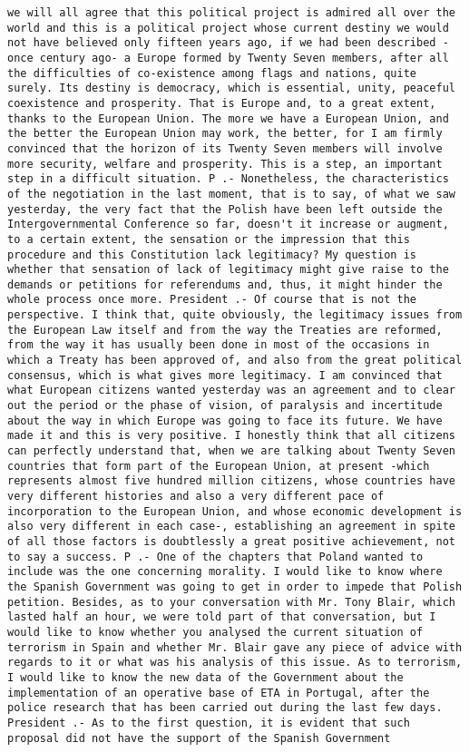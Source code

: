 \documentclass[
]{article}
\begin{document}
\begin{verbatim}
we will all agree that this political project is admired all over the world and this is a political project whose current destiny we would not have believed only fifteen years ago, if we had been described -once century ago- a Europe formed by Twenty Seven members, after all the difficulties of co-existence among flags and nations, quite surely. Its destiny is democracy, which is essential, unity, peaceful coexistence and prosperity. That is Europe and, to a great extent, thanks to the European Union. The more we have a European Union, and the better the European Union may work, the better, for I am firmly convinced that the horizon of its Twenty Seven members will involve more security, welfare and prosperity. This is a step, an important step in a difficult situation. P .- Nonetheless, the characteristics of the negotiation in the last moment, that is to say, of what we saw yesterday, the very fact that the Polish have been left outside the Intergovernmental Conference so far, doesn't it increase or augment, to a certain extent, the sensation or the impression that this procedure and this Constitution lack legitimacy? My question is whether that sensation of lack of legitimacy might give raise to the demands or petitions for referendums and, thus, it might hinder the whole process once more. President .- Of course that is not the perspective. I think that, quite obviously, the legitimacy issues from the European Law itself and from the way the Treaties are reformed, from the way it has usually been done in most of the occasions in which a Treaty has been approved of, and also from the great political consensus, which is what gives more legitimacy. I am convinced that what European citizens wanted yesterday was an agreement and to clear out the period or the phase of vision, of paralysis and incertitude about the way in which Europe was going to face its future. We have made it and this is very positive. I honestly think that all citizens can perfectly understand that, when we are talking about Twenty Seven countries that form part of the European Union, at present -which represents almost five hundred million citizens, whose countries have very different histories and also a very different pace of incorporation to the European Union, and whose economic development is also very different in each case-, establishing an agreement in spite of all those factors is doubtlessly a great positive achievement, not to say a success. P .- One of the chapters that Poland wanted to include was the one concerning morality. I would like to know where the Spanish Government was going to get in order to impede that Polish petition. Besides, as to your conversation with Mr. Tony Blair, which lasted half an hour, we were told part of that conversation, but I would like to know whether you analysed the current situation of terrorism in Spain and whether Mr. Blair gave any piece of advice with regards to it or what was his analysis of this issue. As to terrorism, I would like to know the new data of the Government about the implementation of an operative base of ETA in Portugal, after the police research that has been carried out during the last few days. President .- As to the first question, it is evident that such proposal did not have the support of the Spanish Government 
\end{verbatim}
\end{document}

